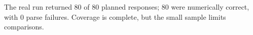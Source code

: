 The real run returned 80 of 80 planned responses; 80 were numerically correct, with 0 parse failures. Coverage is complete, but the small sample limits comparisons.
